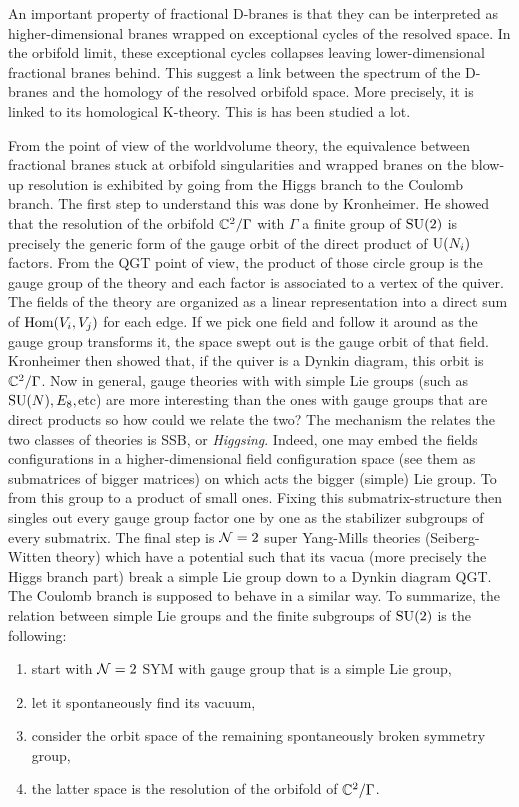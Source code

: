         An important property of fractional D-branes is that they can be interpreted as higher-dimensional branes wrapped on exceptional cycles of the resolved space. In the orbifold limit, these exceptional cycles collapses leaving lower-dimensional fractional branes behind. This suggest a link between the spectrum of the D-branes and the homology of the resolved orbifold space. More precisely, it is linked to its homological K-theory. This is has been studied a lot.

        From the point of view of the worldvolume theory, the equivalence between fractional branes stuck at orbifold singularities and wrapped branes on the blow-up resolution is exhibited by going from the Higgs branch to the Coulomb branch. The first step to understand this was done by Kronheimer. He showed that the resolution of the orbifold $\mathbb{C}^2/\Gamma$ with $\Gamma$ a finite group of $\text{SU}(2)$ is precisely the generic form of the gauge orbit of the direct product of $\text{U}(N_i)$ factors. From the QGT point of view, the product of those circle group is the gauge group of the theory and each factor is associated to a vertex of the quiver. The fields of the theory are organized as a linear representation into a direct sum of $\text{Hom}(V_i,V_j)$ for each edge. If we pick one field and follow it around as the gauge group transforms it, the space swept out is the gauge orbit of that field. Kronheimer then showed that, if the quiver is a Dynkin diagram, this orbit is $\mathbb{C}^2/\Gamma$. Now in general, gauge theories with with simple Lie groups (such as $\text{SU}(N), E_8,$etc) are more interesting than the ones with gauge groups that are direct products so how could we relate the two? The mechanism the relates the two classes of theories is SSB, or \emph{Higgsing}. Indeed, one may embed the fields configurations in a higher-dimensional field configuration space (see them as submatrices of bigger matrices) on which acts the bigger (simple) Lie group. To from this group to a product of small ones. Fixing this submatrix-structure then singles out every gauge group factor one by one as the stabilizer subgroups of every submatrix. The final step is $\mathcal{N}=2$ super Yang-Mills theories (Seiberg-Witten theory) which have a potential such that its vacua (more precisely the Higgs branch part) break a simple Lie group down to a Dynkin diagram QGT. The Coulomb branch is supposed to behave in a similar way. To summarize, the relation between simple Lie groups and the finite subgroups of $\text{SU}(2)$ is the following:
        \begin{enumerate}
            \item start with $\mathcal{N}=2$ SYM with gauge group that is a simple Lie group,
            \item let it spontaneously find its vacuum,
            \item consider the orbit space of the remaining spontaneously broken symmetry group,
            \item the latter space is the resolution of the orbifold of $\mathbb{C}^2/\Gamma$.
        \end{enumerate}
    
